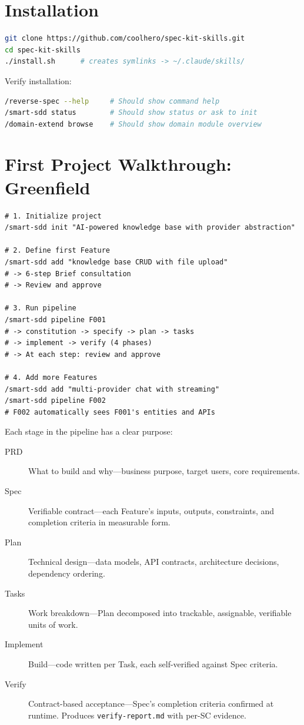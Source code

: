 \documentclass[11pt,a4paper,openright,twoside]{report}
\newcommand{\file}[1]{\texttt{#1}}
\begin{document}
\section{Installation}

\begin{lstlisting}[language=bash]
git clone https://github.com/coolhero/spec-kit-skills.git
cd spec-kit-skills
./install.sh      # creates symlinks -> ~/.claude/skills/
\end{lstlisting}

Verify installation:
\begin{lstlisting}[language=bash]
/reverse-spec --help     # Should show command help
/smart-sdd status        # Should show status or ask to init
/domain-extend browse    # Should show domain module overview
\end{lstlisting}

\section{First Project Walkthrough: Greenfield}

\begin{lstlisting}[title={From Idea to Working App}]
# 1. Initialize project
/smart-sdd init "AI-powered knowledge base with provider abstraction"

# 2. Define first Feature
/smart-sdd add "knowledge base CRUD with file upload"
# -> 6-step Brief consultation
# -> Review and approve

# 3. Run pipeline
/smart-sdd pipeline F001
# -> constitution -> specify -> plan -> tasks
# -> implement -> verify (4 phases)
# -> At each step: review and approve

# 4. Add more Features
/smart-sdd add "multi-provider chat with streaming"
/smart-sdd pipeline F002
# F002 automatically sees F001's entities and APIs
\end{lstlisting}

Each stage in the pipeline has a clear purpose:

\begin{description}
  \item[PRD] What to build and why---business purpose, target users, core requirements.
  \item[Spec] Verifiable contract---each Feature's inputs, outputs, constraints, and completion criteria in measurable form.
  \item[Plan] Technical design---data models, API contracts, architecture decisions, dependency ordering.
  \item[Tasks] Work breakdown---Plan decomposed into trackable, assignable, verifiable units of work.
  \item[Implement] Build---code written per Task, each self-verified against Spec criteria.
  \item[Verify] Contract-based acceptance---Spec's completion criteria confirmed at runtime. Produces \file{verify-report.md} with per-SC evidence.
\end{description}
\end{document}
